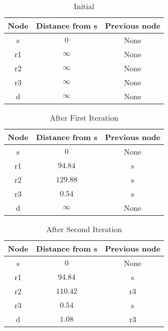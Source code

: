 \documentclass[conference]{IEEEtran}
\begin{document}
\begin{table}[H]
\centering
\caption{Initial}
\label{my-label1}
\begin{tabular}{|c|c|c|}
\hline
\textbf{Node}&\textbf{Distance from s}&\textbf{Previous node}\\ \hline
s&$0$&None\\ \hline
r1&$\infty$&None\\ \hline
r2&$\infty$&None\\ \hline
r3&$\infty$&None\\ \hline
d&$\infty$&None\\ \hline
\end{tabular}
\end{table}


\begin{table}[H]
\centering
\caption{After First Iteration}
\label{my-label1}
\begin{tabular}{|c|c|c|}
\hline
\textbf{Node}&\textbf{Distance from s}&\textbf{Previous node}\\ \hline
s&$0$&None\\ \hline
r1&$94.84$&s\\ \hline
r2&$129.88$&s\\ \hline
r3&$0.54$&s\\ \hline
d&$\infty$&None\\ \hline
\end{tabular}
\end{table}


\begin{table}[H]
\centering
\caption{After Second Iteration}
\label{my-label1}
\begin{tabular}{|c|c|c|}
\hline
\textbf{Node}&\textbf{Distance from s}&\textbf{Previous node}\\ \hline
s&$0$&None\\ \hline
r1&$94.84$&s\\ \hline
r2&$110.42$&r3\\ \hline
r3&$0.54$&s\\ \hline
d&$1.08$&r3\\ \hline
\end{tabular}
\end{table}
\end{document}
